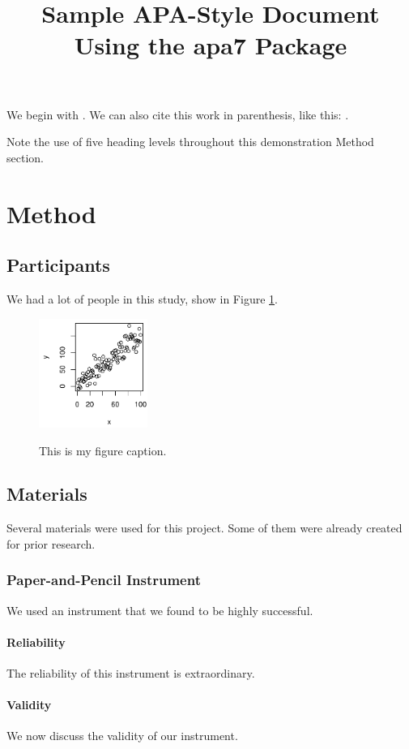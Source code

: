 \documentclass[jou]{apa7}
\title{Sample APA-Style Document Using the \textsf{apa7} Package}
\begin{document}
\maketitle
We begin with \textcite{Shotton1989}.  We can also cite this work in
parenthesis, like this: \parencite{Lassen2006}.

Note the use of five heading levels throughout this demonstration
Method section.

\section{Method}
\subsection{Participants}
We had a lot of people in this study, show in Figure \ref{fig:Figure1}.

\begin{figure}[!htp]
    \caption{This is my figure caption.}
    \includegraphics[bb=0in 0in 2.5in 2.5in, height=1.4in, width=1.4in]{Figure1.pdf}
    \label{fig:Figure1}
\end{figure}

\subsection{Materials}
Several materials were used for this project.  Some of them were
already created for prior research.

\subsubsection{Paper-and-Pencil Instrument}
We used an instrument that we found to be highly successful.

\paragraph{Reliability}
The reliability of this instrument is extraordinary.

\paragraph{Validity}
We now discuss the validity of our instrument.
\end{document}
